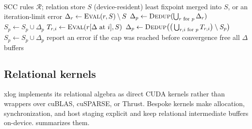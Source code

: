 \begin{algorithm}[htbp]
\caption{GPU semi-naive evaluation of a recursive SCC. All buffers are device-resident.}
\label{alg:seminaive}
\begin{algorithmic}[1]
\Require SCC rules $\mathcal{R}$; relation store $S$ (device-resident)
\Ensure least fixpoint merged into $S$, or an iteration-limit error
  \State $\Delta_r \gets \textsc{Eval}(r, S) \setminus S$ 
\EndFor
{}
  \State $\Delta_p \gets \textsc{Dedup}(\bigcup_{r\text{ for }p}\Delta_r)$
  \State $S_p \gets S_p \cup \Delta_p$ 
\EndFor
\Repeat
    \State $T_{r,i} \gets \textsc{Eval}(r[\Delta \text{ at } i], S)$ 
  \EndFor
    \State $\Delta_p \gets \textsc{Dedup}\big(\big(\textstyle\bigcup_{r,i \text{ for } p} T_{r,i}\big) \setminus S_p\big)$
    \State $S_p \gets S_p \cup \Delta_p$ 
  \EndFor
{}
\State report an error if the cap was reached before convergence
\State free all $\Delta$ buffers
\end{algorithmic}
\end{algorithm}

\subsection{Relational kernels}

xlog implements its relational algebra as direct CUDA kernels rather than wrappers over cuBLAS, cuSPARSE, or Thrust. Bespoke kernels make allocation, synchronization, and host staging explicit and keep relational intermediate buffers on-device.  summarizes them.

